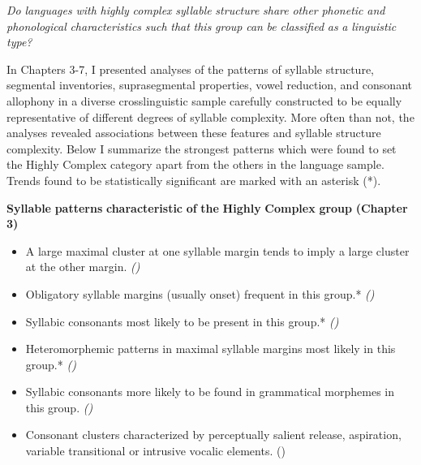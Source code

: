 \ea\label{ex:(8.1)}
   \textit{Do} \textit{languages} \textit{with} \textit{highly} \textit{complex} \textit{syllable} \textit{structure} \textit{share} \textit{other} \textit{phonetic} \textit{and} \textit{phonological} \textit{characteristics} \textit{such} \textit{that} \textit{this} \textit{group} \textit{can} \textit{be} \textit{classified} \textit{as} \textit{a} \textit{linguistic} \textit{type?}
\z

  In Chapters 3-7, I presented analyses of the patterns of syllable structure, segmental inventories, suprasegmental properties, vowel reduction, and consonant allophony in a diverse crosslinguistic sample carefully constructed to be equally representative of different degrees of syllable complexity. More often than not, the analyses revealed associations between these features and syllable structure complexity. Below I summarize the strongest patterns which were found to set the Highly Complex category apart from the others in the language sample. Trends found to be statistically significant are marked with an asterisk (*).

\textbf{Syllable} \textbf{patterns} \textbf{characteristic} \textbf{of} \textbf{the} \textbf{Highly} \textbf{Complex} \textbf{group} \textbf{(Chapter} \textbf{3)}

\begin{itemize}
\item 
A large maximal cluster at one syllable margin tends to imply a large cluster at the other margin. \textit{()}

\item 
Obligatory syllable margins (usually onset) frequent in this group.* \textit{()}

\item 
Syllabic consonants most likely to be present in this group.* \textit{()}

\item 
Heteromorphemic patterns in maximal syllable margins most likely in this group.* \textit{()}

\item 
Syllabic consonants more likely to be found in grammatical morphemes in this group. \textit{()}

\item 
Consonant clusters characterized by perceptually salient release, aspiration, variable transitional or intrusive vocalic elements. (\textit{})

\end{itemize}

